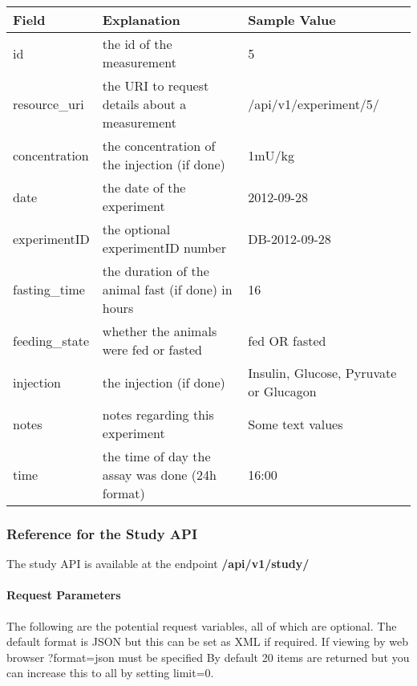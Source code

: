 \documentclass[letterpaper,10pt,english]{sphinxmanual}
\begin{document}
\begin{tabulary}{\linewidth}{|L|L|L|}
\hline
\textbf{
Field
} & \textbf{
Explanation
} & \textbf{
Sample Value
}\\\hline

id
 & 
the id of the measurement
 & 
5
\\\hline

resource\_uri
 & 
the URI to request details about a measurement
 & 
/api/v1/experiment/5/
\\\hline

concentration
 & 
the concentration of the injection (if done)
 & 
1mU/kg
\\\hline

date
 & 
the date of the experiment
 & 
2012-09-28
\\\hline

experimentID
 & 
the optional experimentID number
 & 
DB-2012-09-28
\\\hline

fasting\_time
 & 
the duration of the animal fast (if done) in hours
 & 
16
\\\hline

feeding\_state
 & 
whether the animals were fed or fasted
 & 
fed OR fasted
\\\hline

injection
 & 
the injection (if done)
 & 
Insulin, Glucose, Pyruvate or Glucagon
\\\hline

notes
 & 
notes regarding this experiment
 & 
Some text values
\\\hline

time
 & 
the time of day the assay was done (24h format)
 & 
16:00
\\\hline
\end{tabulary}



\subsubsection{Reference for the Study API}
\label{data:reference-for-the-study-api}
The study API is available at the endpoint \textbf{/api/v1/study/}


\paragraph{Request Parameters}
\label{data:id5}
The following are the potential request variables, all of which are optional.  
The default format is JSON but this can be set as XML if required.
If viewing by web browser ?format=json must be specified  
By default 20 items are returned but you can increase this to all by setting limit=0.
\end{document}
